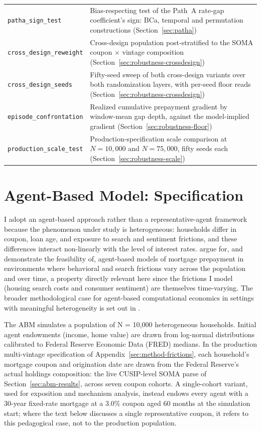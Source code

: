 \documentclass[12pt]{article}
\begin{document}
\begin{table}[H]
\begin{threeparttable}
\begin{tabular}{@{}p{5.4cm}p{8.8cm}@{}}
\texttt{patha\_sign\_test} & Bias-respecting test of the Path~A rate-gap coefficient's sign: BCa, temporal and permutation constructions (Section~\ref{sec:patha}) \\
\texttt{cross\_design\_reweight} & Cross-design population post-stratified to the SOMA coupon $\times$ vintage composition (Section~\ref{sec:robustness-crossdesign}) \\
\texttt{cross\_design\_seeds} & Fifty-seed sweep of both cross-design variants over both randomization layers, with per-seed floor reads (Section~\ref{sec:robustness-crossdesign}) \\
\texttt{episode\_confrontation} & Realized cumulative prepayment gradient by window-mean gap depth, against the model-implied gradient (Section~\ref{sec:robustness-floor}) \\
\texttt{production\_scale\_test} & Production-specification scale comparison at $N = 10{,}000$ and $N = 75{,}000$, fifty seeds each (Section~\ref{sec:robustness-scale}) \\
\bottomrule
\end{tabular}
\end{threeparttable}
\end{table}

\section{Agent-Based Model: Specification}\label{sec:method-abm}

I adopt an agent-based approach rather than a representative-agent framework because the phenomenon under study is heterogeneous: households differ in coupon, loan age, and exposure to search and sentiment frictions, and these differences interact non-linearly with the level of interest rates. \citet{geanakoplos2012} argue for, and demonstrate the feasibility of, agent-based models of mortgage prepayment in environments where behavioral and search frictions vary across the population and over time, a property directly relevant here since the frictions I model (housing search costs and consumer sentiment) are themselves time-varying. The broader methodological case for agent-based computational economics in settings with meaningful heterogeneity is set out in \citet{tesfatsion2006}.

The ABM simulates a population of N = 10,000 heterogeneous households. Initial agent endowments (income, home value) are drawn from log-normal distributions calibrated to Federal Reserve Economic Data (FRED) medians. In the production multi-vintage specification of Appendix~\ref{sec:method-frictions}, each household's mortgage coupon and origination date are drawn from the Federal Reserve's actual holdings composition: the live CUSIP-level SOMA parse of Section~\ref{sec:abm-results}, across seven coupon cohorts. A single-cohort variant, used for exposition and mechanism analysis, instead endows every agent with a 30-year fixed-rate mortgage at a 3.0\% coupon aged 60 months at the simulation start; where the text below discusses a single representative coupon, it refers to this pedagogical case, not to the production population.
\end{document}
